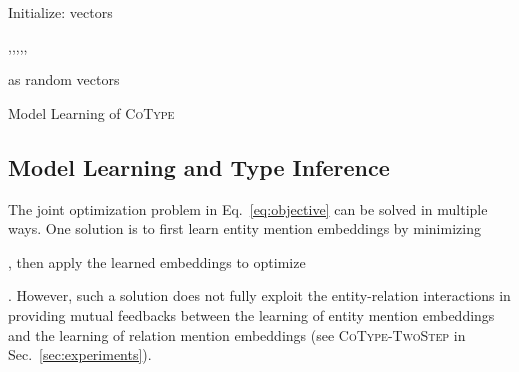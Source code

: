 \documentclass[letterpaper]{sig-alternate-2013}
\begin{document}
\begin{algorithm}[t]
\begin{small}
\DontPrintSemicolon
{}
Initialize: vectors \begin{tiny},,,,,\end{tiny} as random vectors\;
\caption{\small {Model Learning of \textsc{CoType}}}
\label{algorithm:cotype}
\end{small}
\end{algorithm}





\subsection{Model Learning and Type Inference}
\label{subsec:algorithm}
The joint optimization problem in Eq.~\eqref{eq:objective} can be solved in multiple ways. One solution is to first learn entity mention embeddings by minimizing \begin{small}\end{small}, then apply the learned embeddings to optimize \begin{small}\end{small}. However, such a solution does not fully exploit the entity-relation interactions in providing mutual feedbacks between the learning of entity mention embeddings and the learning of relation mention embeddings (see \textsc{CoType-TwoStep} in Sec.~\ref{sec:experiments}). 
\end{document}
